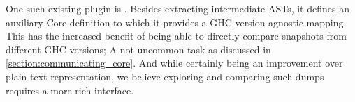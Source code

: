 One such existing plugin is  \cite{ghc_dump}. Besides extracting intermediate ASTs, it defines an
auxiliary Core definition to which it provides a GHC version agnostic mapping. This has the increased benefit of 
being able to directly compare snapshots from different GHC versions; A not uncommon task as discussed in \cref{section:communicating_core}.
And while certainly being an improvement over plain text representation, we believe exploring and comparing such
dumps requires a more rich interface.

